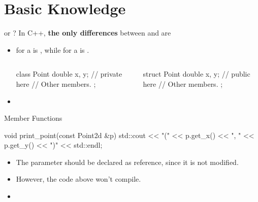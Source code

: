 \documentclass{beamer}
\begin{document}
\section{Basic Knowledge}

\begin{frame}[fragile]{\class or \struct?}
    In C++, \textbf{the only differences} between \class and \struct are
    \begin{itemize}
        \item {} for a \class is , while for a \struct is .
        \begin{columns}
            \begin{column}{0.5\linewidth}
                \begin{cpp}
class Point {
  double x, y; // private here
  // Other members.
};
                \end{cpp}
            \end{column}
            \begin{column}{0.5\linewidth}
                \begin{cpp}
struct Point {
  double x, y; // public here
  // Other members.
};
                \end{cpp}
            \end{column}
        \end{columns}
        \item {}
    \end{itemize}
\end{frame}

\begin{frame}[fragile]{\const Member Functions}
    \begin{cpp}
void print_point(const Point2d &p) {
  std::cout << "(" << p.get_x() << ", "
            << p.get_y() << ")" << std::endl;
}
    \end{cpp}
    \begin{itemize}
        \item The parameter should be declared as \const reference, since it is not modified.
        \item However, the code above won't compile.
        \item {}
    \end{itemize}
\end{frame}
\end{document}
